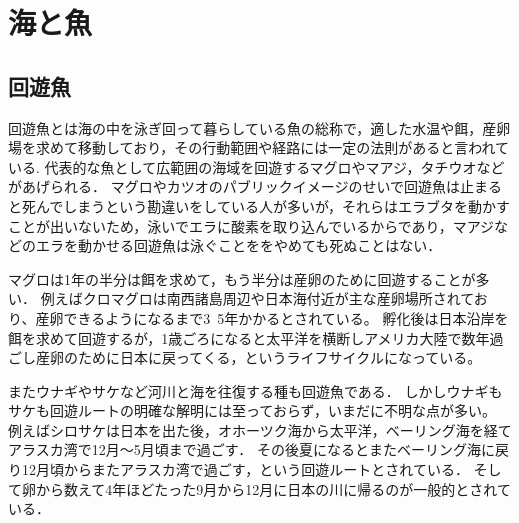 \documentclass[12pt,a4j,titlepage]{ltjsarticle}
\begin{document}
\section{海と魚}\label{海と魚}
\subsection{回遊魚}
回遊魚とは海の中を泳ぎ回って暮らしている魚の総称で，適した水温や餌，産卵場を求めて移動しており，その行動範囲や経路には一定の法則があると言われている\cite{kairyuu}.
代表的な魚として広範囲の海域を回遊するマグロやマアジ，タチウオなどがあげられる．
マグロやカツオのパブリックイメージのせいで回遊魚は止まると死んでしまうという勘違いをしている人が多いが，それらはエラブタを動かすことが出いないため，泳いでエラに酸素を取り込んでいるからであり，マアジなどのエラを動かせる回遊魚は泳ぐことををやめても死ぬことはない．\par
マグロは1年の半分は餌を求めて，もう半分は産卵のために回遊することが多い．
例えばクロマグロは南西諸島周辺や日本海付近が主な産卵場所されており、産卵できるようになるまで3~5年かかるとされている。
孵化後は日本沿岸を餌を求めて回遊するが，1歳ごろになると太平洋を横断しアメリカ大陸で数年過ごし産卵のために日本に戻ってくる，というライフサイクルになっている。\par
またウナギやサケなど河川と海を往復する種も回遊魚である．
しかしウナギもサケも回遊ルートの明確な解明には至っておらず，いまだに不明な点が多い。
例えばシロサケは日本を出た後，オホーツク海から太平洋，ベーリング海を経てアラスカ湾で12月〜5月頃まで過ごす．
その後夏になるとまたベーリング海に戻り12月頃からまたアラスカ湾で過ごす，という回遊ルートとされている．
そして卵から数えて4年ほどたった9月から12月に日本の川に帰るのが一般的とされている．
\end{document}
